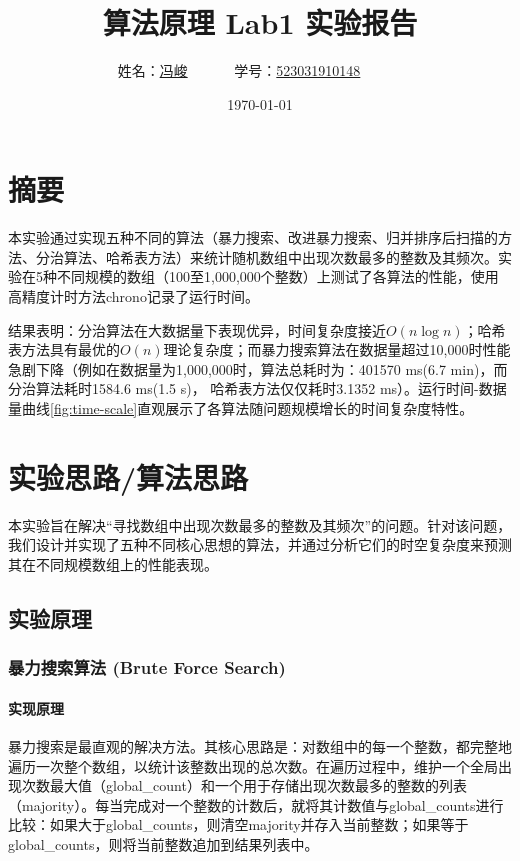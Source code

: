 \documentclass[UTF8,12pt,a4paper]{ctexart}
\title{算法原理 Lab1 实验报告}
\author{
	姓名：\underline{冯峻}~~~~~~
	学号：\underline{523031910148}~~~~~~}
\date{\today}
\begin{document}
\fancyfoot[C]{\thepage}

\maketitle
\tableofcontents
\newpage

\section{摘要}
本实验通过实现五种不同的算法（暴力搜索、改进暴力搜索、归并排序后扫描的方法、分治算法、哈希表方法）来统计随机数组中出现次数最多的整数及其频次。实验在5种不同规模的数组（100至1,000,000个整数）上测试了各算法的性能，使用高精度计时方法chrono记录了运行时间。

结果表明：分治算法在大数据量下表现优异，时间复杂度接近$O(n\log n)$；哈希表方法具有最优的$O(n)$理论复杂度；而暴力搜索算法在数据量超过10,000时性能急剧下降（例如在数据量为1,000,000时，算法总耗时为：401570 ms(6.7 min)，而分治算法耗时1584.6 ms(1.5 s)， 哈希表方法仅仅耗时3.1352 ms）。运行时间-数据量曲线\ref{fig:time-scale}直观展示了各算法随问题规模增长的时间复杂度特性。

\newpage
\section{实验思路/算法思路}
本实验旨在解决“寻找数组中出现次数最多的整数及其频次”的问题。针对该问题，我们设计并实现了五种不同核心思想的算法，并通过分析它们的时空复杂度来预测其在不同规模数组上的性能表现。


\subsection{实验原理}
\subsubsection{暴力搜索算法 (Brute Force Search)}
\paragraph{实现原理}
暴力搜索是最直观的解决方法。其核心思路是：对数组中的每一个整数，都完整地遍历一次整个数组，以统计该整数出现的总次数。在遍历过程中，维护一个全局出现次数最大值（global\_count）和一个用于存储出现次数最多的整数的列表（majority）。每当完成对一个整数的计数后，就将其计数值与global\_counts进行比较：如果大于global\_counts，则清空majority并存入当前整数；如果等于global\_counts，则将当前整数追加到结果列表中。
\end{document}
